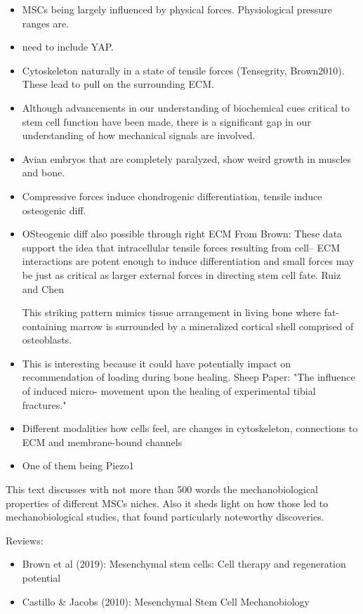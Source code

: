 \begin{itemize}
	\item MSCs being largely influenced by physical forces. Physiological pressure ranges are.
	\item need to include YAP. 
	\item Cytoskeleton naturally in a state of tensile forces (Tensegrity, Brown2010). These lead to pull on the surrounding ECM. 
	\item Although advancements in our understanding of biochemical cues critical to stem cell function have been made, there is a significant gap in our understanding of how mechanical signals are involved.
	\item Avian embryos that are completely paralyzed, show weird growth in muscles and bone.
	\item Compressive forces induce chondrogenic differentiation, tensile induce osteogenic diff.
	\item OSteogenic diff also possible through right ECM From Brown: These data support the idea that intracellular tensile forces resulting from cell– ECM interactions are potent enough to induce differentiation and small forces may be just as critical as larger external forces in directing stem cell fate. Ruiz and Chen

This striking pattern mimics tissue arrangement in living bone where fat-containing marrow is surrounded by a mineralized cortical shell comprised of osteoblasts. 
	\item This is interesting because it could have potentially impact on recommendation of loading during bone healing. Sheep Paper: "The influence of induced micro- movement upon the healing of experimental tibial fractures."
	\item Different modalities how cells feel, are changes in cytoskeleton, connections to ECM and membrane-bound channels
	\item One of them being Piezo1	
	
	
\end{itemize}

This text discusses with not more than 500 words the mechanobiological properties of different MSCs niches. Also it sheds light on how those led to mechanobiological studies, that found particularly noteworthy discoveries. \par

Reviews:
\begin{itemize}
	\item Brown et al (2019): Mesenchymal stem cells: Cell therapy and regeneration potential
	\item Castillo \& Jacobs (2010): Mesenchymal Stem Cell Mechanobiology
\end{itemize}


